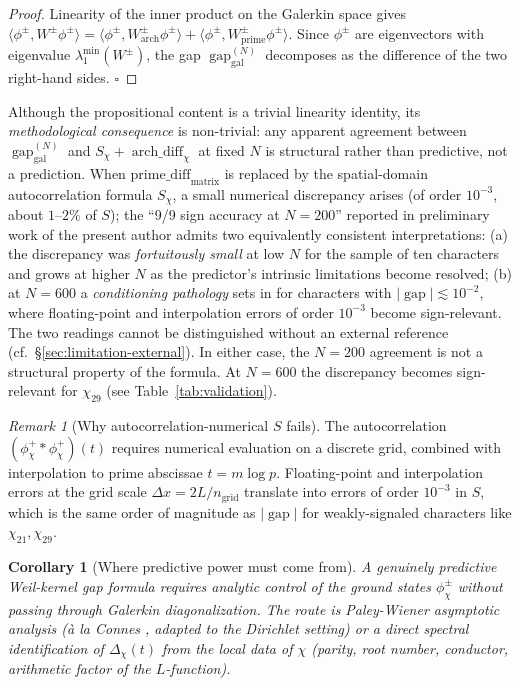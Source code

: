 \documentclass[10pt,twocolumn]{article}
\newtheorem{corollary}[theorem]{Corollary}
\theoremstyle{definition}
\theoremstyle{remark}
\newtheorem{remark}[theorem]{Remark}
\newcommand{\gap}{\operatorname{gap}}
\newcommand{\chifn}{\chi}
\newcommand{\Deltachi}{\Delta_{\chifn}}
\newcommand{\archdiff}{\operatorname{arch\_diff}}
\begin{document}
\begin{proof}
Linearity of the inner product on the Galerkin space gives
$\langle\phi^\pm, W^\pm\phi^\pm\rangle = \langle\phi^\pm,
W^\pm_{\mathrm{arch}}\phi^\pm\rangle + \langle\phi^\pm,
W^\pm_{\mathrm{prime}}\phi^\pm\rangle$.
Since $\phi^\pm$ are eigenvectors with eigenvalue
$\lambda_1^{\min}(W^\pm)$, the gap
$\gap_{\mathrm{gal}}^{(N)}$ decomposes as the difference of the two
right-hand sides. $\square$
\end{proof}

Although the propositional content is a trivial linearity identity, its
\emph{methodological consequence} is non-trivial: any apparent agreement
between $\gap_{\mathrm{gal}}^{(N)}$ and $S_\chi + \archdiff_\chi$ at fixed
$N$ is structural rather than predictive, not a prediction. When
$\mathrm{prime\_diff}_{\mathrm{matrix}}$ is replaced by the spatial-domain
autocorrelation formula $S_{\chifn}$, a small numerical discrepancy arises
(of order $10^{-3}$, about $1$--$2\%$ of $S$); the ``9/9 sign accuracy at
$N=200$'' reported in preliminary work of the present author admits two
equivalently consistent interpretations: (a) the discrepancy was
\emph{fortuitously small} at low $N$ for the sample of ten characters and
grows at higher $N$ as the predictor's intrinsic limitations become
resolved; (b) at $N=600$ a \emph{conditioning pathology} sets in for
characters with $|\gap|\lesssim 10^{-2}$, where floating-point and
interpolation errors of order $10^{-3}$ become sign-relevant. The two
readings cannot be distinguished without an external reference (cf.\
\S\ref{sec:limitation-external}). In either case, the $N=200$ agreement
is not a structural property of the formula. At $N=600$ the discrepancy
becomes sign-relevant for $\chifn_{29}$ (see Table~\ref{tab:validation}).

\begin{remark}[Why autocorrelation-numerical $S$ fails]
The autocorrelation $(\phi_{\chifn}^+\ast\phi_{\chifn}^+)(t)$ requires
numerical evaluation on a discrete grid, combined with interpolation to
prime abscissae $t=m\log p$. Floating-point and interpolation errors
at the grid scale $\Delta x = 2L/n_{\mathrm{grid}}$ translate into errors
of order $10^{-3}$ in $S$, which is the same order of magnitude as
$|\gap|$ for weakly-signaled characters like $\chi_{21},\chi_{29}$.
\end{remark}

\begin{corollary}[Where predictive power must come from]
\label{cor:paleywiener}
A genuinely predictive Weil-kernel gap formula requires analytic control
of the ground states $\phi^\pm_{\chifn}$ \emph{without} passing through
Galerkin diagonalization. The route is Paley-Wiener asymptotic analysis
(\`a la Connes \cite{Connes}, adapted to the Dirichlet setting) or a
direct spectral identification of $\Deltachi(t)$ from the local data
of $\chifn$ (parity, root number, conductor, arithmetic factor of the
$L$-function).
\end{corollary}
\end{document}
